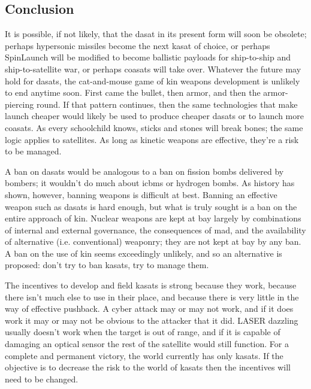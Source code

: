 \subsection{Conclusion}

It is possible, if not likely, that the \ac{dasat} in its present form
will soon be obsolete; perhaps hypersonic missiles become the next
\ac{kasat} of choice, or perhaps SpinLaunch will be modified to become
ballistic payloads for ship-to-ship and ship-to-satellite war, or
perhaps \acp{coasat} will take over.  Whatever the future may hold for
\acp{dasat}, the cat-and-mouse game of \ac{kin} weapons development is
unlikely to end anytime soon.  First came the bullet, then armor, and
then the armor-piercing round.  If that pattern continues, then the
same technologies that make launch cheaper would likely be used to
produce cheaper \acp{dasat} or to launch more \acp{coasat}.  As every
schoolchild knows, sticks and stones will break bones; the same logic
applies to satellites.  As long as kinetic weapons are effective,
they're a risk to be managed.

A ban on \aclp{dasat} would be analogous to a ban on fission bombs
delivered by bombers; it wouldn't do much about \acp{icbm} or hydrogen
bombs.  As history has shown, however, banning weapons is difficult at
best.  Banning an effective weapon such as \acp{dasat} is hard enough,
but what is truly sought is a ban on the entire approach of \ac{kin}.
Nuclear weapons are kept at bay largely by combinations of internal
and external governance, the consequences of \ac{mad}, and the
availability of alternative (i.e. conventional) weaponry; they are not
kept at bay by any ban.  A ban on the use of \ac{kin} seems
exceedingly unlikely, and so an alternative is proposed: don't try to
ban \acp{kasat}, try to manage them.

The incentives to develop and field \acp{kasat} is strong because they
work, because there isn't much else to use in their place, and because
there is very little in the way of effective pushback.  A cyber attack
may or may not work, and if it does work it may or may not be obvious
to the attacker that it did.  LASER dazzling usually doesn't work when
the target is out of range, and if it is capable of damaging an
optical sensor the rest of the satellite would still function.  For a
complete and permanent victory, the world currently has only
\acp{kasat}.  If the objective is to decrease the risk to the world of
\acp{kasat} then the incentives will need to be changed.
